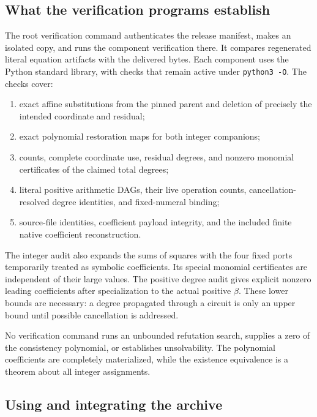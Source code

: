 \documentclass[11pt,letterpaper]{article}
\theoremstyle{remark}
\begin{document}
\subsection{What the verification programs establish}

The root verification command authenticates the release manifest, makes
an isolated copy, and runs the component verification there.  It compares
regenerated literal equation artifacts with the delivered bytes.  Each
component uses the Python standard library, with checks that remain
active under \texttt{python3 -O}.  The checks cover:
\begin{enumerate}[leftmargin=1.5em]
\item exact affine substitutions from the pinned parent and deletion of
      precisely the intended coordinate and residual;
\item exact polynomial restoration maps for both integer companions;
\item counts, complete coordinate use, residual degrees, and nonzero
      monomial certificates of the claimed total degrees;
\item literal positive arithmetic DAGs, their live operation counts,
      cancellation-resolved degree identities, and fixed-numeral binding;
\item source-file identities, coefficient payload integrity, and the
      included finite native coefficient reconstruction.
\end{enumerate}

The integer audit also expands the sums of squares with the four fixed
ports temporarily treated as symbolic coefficients.  Its special
monomial certificates are independent of their large values.  The
positive degree audit gives explicit nonzero leading coefficients after
specialization to the actual positive $\beta$.  These lower bounds are
necessary: a degree propagated through a circuit is only an upper bound
until possible cancellation is addressed.

No verification command runs an unbounded refutation search, supplies a
zero of the consistency polynomial, or establishes unsolvability.
The polynomial coefficients are completely materialized, while the
existence equivalence is a theorem about all integer assignments.

\subsection{Using and integrating the archive}
\end{document}
